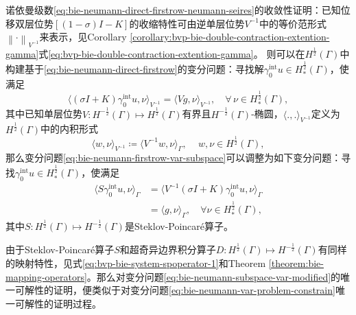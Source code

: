 诺依曼级数\eqref{eq:bie-neumann-direct-firstrow-neumann-seires}的收敛性证明：已知位移双层位势$\left[ \left(1-\sigma \right) I - K \right]$的收缩特性可由逆单层位势$V^{-1}$中的等价范形式$\left\| \cdot \right\|_{V^{-1}}$来表示，见Corollary \ref{corollary:bvp-bie-double-contraction-extention-gamma}式\eqref{eq:bvp-bie-double-contraction-extention-gamma}。
则可以在$H^{\frac{1}{2}}(\Gamma)$中构建基于\eqref{eq:bie-neumann-direct-firstrow}的变分问题：寻找解$\gamma_{0}^{\text{int}} u \in H_{*}^{\frac{1}{2}}(\Gamma)$，使满足
\begin{equation}
  \label{eq:bie-neumann-firstrow-var-subspace}
  \langle
  \left( \sigma I + K \right) \gamma_{0}^{\text{int}} u, \nu
  \rangle_{V^{-1}} =
  \langle V g, \nu \rangle_{V^{-1}}, \quad \forall \, \nu \in H_{*}^{\frac{1}{2}}(\Gamma),
\end{equation}
其中已知单层位势$V:H^{-\frac{1}{2}}(\Gamma) \mapsto H^{\frac{1}{2}}(\Gamma)$有界且$H^{-\frac{1}{2}}(\Gamma)$-椭圆，$\langle .,. \rangle_{V^{-1}}$定义为$H^{\frac{1}{2}}(\Gamma)$中的内积形式
\begin{equation*}
  \langle w, \nu \rangle_{V^{-1}} \coloneqq
  \langle V^{-1} w, \nu \rangle_{\Gamma}, \quad \, w, \nu \in H^{\frac{1}{2}}(\Gamma),
\end{equation*}
那么变分问题\eqref{eq:bie-neumann-firstrow-var-subspace}可以调整为如下变分问题：寻找$\gamma_{0}^{\text{int}} u \in H_{*}^{\frac{1}{2}}(\Gamma)$，使满足
\begin{equation}
\label{eq:bie-neumann-subspace-var-modified}
\begin{split}
  \langle S \gamma_{0}^{\text{int}} u, \nu \rangle_{\Gamma}
  & = \langle
  V^{-1} \left( \sigma I + K \right) \gamma_{0}^{\text{int}} u, \nu
  \rangle_{\Gamma} \\
  & = \langle g, \nu \rangle_{\Gamma}, \quad \forall \nu \in H_{*}^{\frac{1}{2}}(\Gamma),
\end{split}
\end{equation}
其中$S: H^{\frac{1}{2}}(\Gamma) \mapsto H^{-\frac{1}{2}}(\Gamma)$是Steklov-Poincaré算子。

由于Steklov-Poincaré算子$S$和超奇异边界积分算子$D:H^{\frac{1}{2}}(\Gamma) \mapsto H^{-\frac{1}{2}}(\Gamma)$有同样的映射特性，见式\eqref{eq:bvp-bie-system-spoperator-1}和Theorem \ref{theorem:bie-mapping-operators}。那么对变分问题\eqref{eq:bie-neumann-subspace-var-modified}的唯一可解性的证明，便类似于对变分问题\eqref{eq:bie-neumann-var-problem-constrain}唯一可解性的证明过程。


